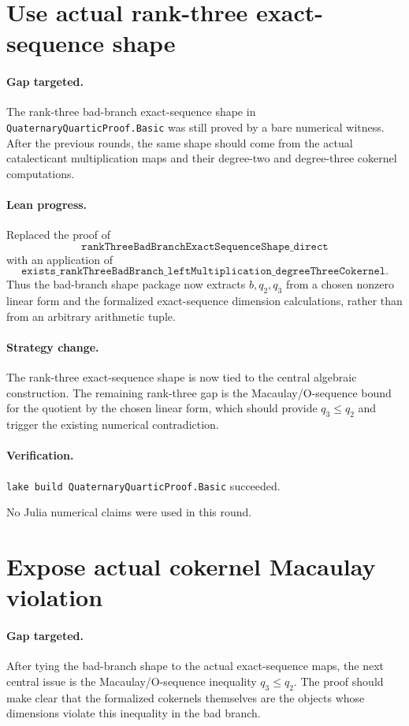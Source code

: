 \documentclass[11pt]{article}
\begin{document}
\section*{Use actual rank-three exact-sequence shape}

\paragraph{Gap targeted.}
The rank-three bad-branch exact-sequence shape in
\texttt{QuaternaryQuarticProof.Basic} was still proved by a bare numerical
witness.  After the previous rounds, the same shape should come from the
actual catalecticant multiplication maps and their degree-two and degree-three
cokernel computations.

\paragraph{Lean progress.}
Replaced the proof of
\[
\texttt{rankThreeBadBranchExactSequenceShape\_direct}
\]
with an application of
\[
\texttt{exists\_rankThreeBadBranch\_leftMultiplication\_degreeThreeCokernel}.
\]
Thus the bad-branch shape package now extracts \(b,q_2,q_3\) from a chosen
nonzero linear form and the formalized exact-sequence dimension calculations,
rather than from an arbitrary arithmetic tuple.

\paragraph{Strategy change.}
The rank-three exact-sequence shape is now tied to the central algebraic
construction.  The remaining rank-three gap is the Macaulay/O-sequence bound
for the quotient by the chosen linear form, which should provide
\(q_3\le q_2\) and trigger the existing numerical contradiction.

\paragraph{Verification.}
\texttt{lake build QuaternaryQuarticProof.Basic} succeeded.

No Julia numerical claims were used in this round.

\section*{Expose actual cokernel Macaulay violation}

\paragraph{Gap targeted.}
After tying the bad-branch shape to the actual exact-sequence maps, the next
central issue is the Macaulay/O-sequence inequality \(q_3\le q_2\).  The proof
should make clear that the formalized cokernels themselves are the objects
whose dimensions violate this inequality in the bad branch.
\end{document}
